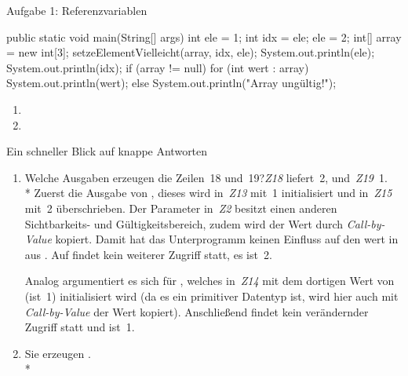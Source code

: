 {\begin{frame}[fragile]{Aufgabe 1: Referenzvariablen}
\begin{plainjava}[multicols=2,lineskip=-.5pt,prebreak={},numbers=left,numbersep=2pt]
{  public static void main(String[] args) {
    int ele = 1;
    int idx = ele;
    ele = 2;
    int[] array = new int[3];
    setzeElementVielleicht(array, idx, ele);
    System.out.println(ele);
    System.out.println(idx);
    if (array != null) {
      for (int wert : array) {
        System.out.println(wert);
      }
    } else {
      System.out.println("Array ungültig!");
    }
  }
}
\end{plainjava}
\vspace*{-4mm}\begin{enumerate}
    \item<3-> 
    \item<4-> 
\end{enumerate}
\end{frame}
{\def\n{\textcolor{codeouthl}{\textbackslash n}\,}
\def\Z#1;{\textit{Z#1}}
\begin{frame}{Ein schneller Blick auf knappe Antworten}
\begin{enumerate}[<+(1)->]
    \itemsep10pt
    \item {\intask Welche Ausgaben erzeugen die Zeilen~18 und~19?}\hfill\pause\Z18; liefert~2, und~\Z19;~1.\smallskip\\*
    Zuerst die Ausgabe von , dieses wird in~\Z13; mit~1 initialisiert und in~\Z15; mit~2 überschrieben. \pause Der Parameter  in~\Z2; besitzt einen anderen Sichtbarkeits- und Gültigkeitsbereich, zudem wird der Wert durch \textit{Call-by-Value} kopiert. Damit hat das Unterprogramm keinen Einfluss auf den wert in  aus . \pause Auf  findet kein weiterer Zugriff statt, es ist~2.\smallskip\par\pause
    Analog argumentiert es sich für , welches in~\Z14; mit dem dortigen Wert von  (ist~1) initialisiert wird (da es ein primitiver Datentyp ist, wird hier auch mit \textit{Call-by-Value} der Wert kopiert). \pause Anschließend findet kein verändernder Zugriff statt und  ist~1.
    \item {}\par
    \pause Sie erzeugen \say{\T{0\n2\n0}} .\\*
\end{enumerate}
\end{frame}

}}
